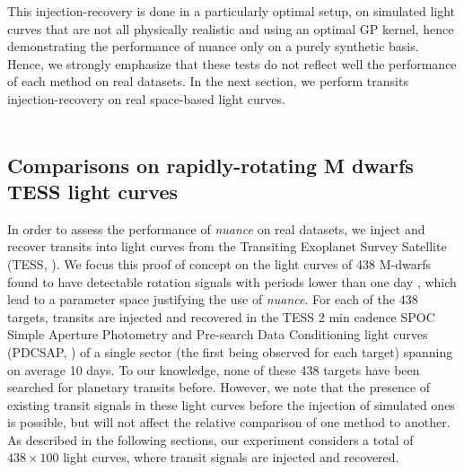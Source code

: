 \documentclass[modern,linenumbers]{aastex631}
\newcommand{\nuancemethod}{\textit{nuance}}
\newcommand{\nuance}{\nuancemethod{}}
\newcommand{\review}[1]{#1}
\begin{document}
\noindent This injection-recovery is done in a particularly optimal setup, on simulated light curves that are not all physically realistic and using an optimal GP kernel, hence demonstrating the performance of \textsf{nuance} only on a purely \review{synthetic}{} basis. \review{Hence, we strongly emphasize that these tests do not reflect well the performance of each method on real datasets}. In the next section, we perform transits injection-recovery on real space-based light curves.\\\\
\subsection{Comparisons on rapidly-rotating M dwarfs TESS light curves}\label{real}
In order to assess the performance of \nuance{} on real datasets, we inject and recover transits into light curves from the Transiting Exoplanet Survey Satellite (TESS, \citealt{tess}). We focus this proof of concept \review{on the light curves of 438 M-dwarfs found to have detectable rotation signals with periods lower than one day}{} \citep{Ramsay2020}, which lead to a parameter space justifying the use of \nuance{}. For each \review{of the 438}{} targets, transits are injected and recovered in the TESS 2 min cadence SPOC Simple Aperture Photometry and Pre-search Data Conditioning light curves (PDCSAP, \citealt{spoc}) of a single sector (the first being observed for each target) spanning on average 10 days. To our knowledge, none of these 438 targets have been searched for planetary transits before. However, we note that the presence of existing transit signals in these light curves before the injection of simulated ones is possible, but will not affect the relative  comparison of one method to another. \review{As described in the following sections, our experiment considers a total of $438 \times 100$ light curves, where transit signals are injected and recovered.}\\\\
\end{document}
